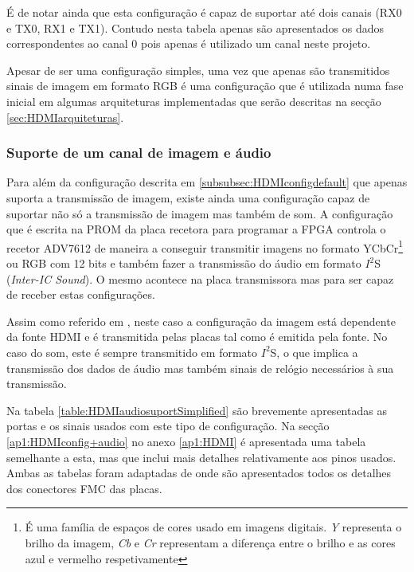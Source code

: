É de notar ainda que esta configuração é capaz de suportar até dois canais (RX0 e TX0, RX1 e TX1). Contudo nesta tabela apenas são apresentados os dados correspondentes ao canal 0 pois apenas é utilizado um canal neste projeto. 

Apesar de ser uma configuração simples, uma vez que apenas são transmitidos sinais de imagem em formato RGB é uma configuração que é utilizada numa fase inicial em algumas arquiteturas implementadas que serão descritas na secção \ref{sec:HDMIarquiteturas}.

\subsubsection{Suporte de um canal de imagem e áudio} \label {subsubsec:HDMIconfig+audio}

Para além da configuração descrita em \ref{subsubsec:HDMIconfigdefault} que apenas suporta a transmissão de imagem, existe ainda uma configuração capaz de suportar não só a transmissão de imagem mas também de som. A configuração que é escrita na PROM da placa recetora para programar a FPGA controla o recetor ADV7612 de maneira a conseguir transmitir imagens no formato YCbCr\footnote{É uma família de espaços de cores usado em imagens digitais. \textit{Y} representa o brilho da imagem, \textit{Cb} e \textit{Cr} representam a diferença entre o brilho e as cores azul e vermelho respetivamente} ou RGB com 12 bits e também fazer a transmissão do áudio em formato $I^{2}$S (\textit{Inter-IC Sound}). O mesmo acontece na placa transmissora mas para ser capaz de receber estas configurações.

Assim como referido em \cite{R014}, neste caso a configuração da imagem está dependente da fonte HDMI e é transmitida pelas placas tal como é emitida pela fonte. No caso do som, este é sempre transmitido em formato $I^{2}$S, o que implica a transmissão dos dados de áudio mas também sinais de relógio necessários à sua transmissão.

Na tabela \ref{table:HDMIaudiosuportSimplified} são brevemente apresentadas as portas e os sinais usados com este tipo de configuração. Na secção \ref{ap1:HDMIconfig+audio} no anexo \ref{ap1:HDMI} é apresentada uma tabela semelhante a esta, mas que inclui mais detalhes relativamente aos pinos usados. Ambas as tabelas foram adaptadas de \cite{R014} onde são apresentados todos os detalhes dos conectores FMC das placas.

